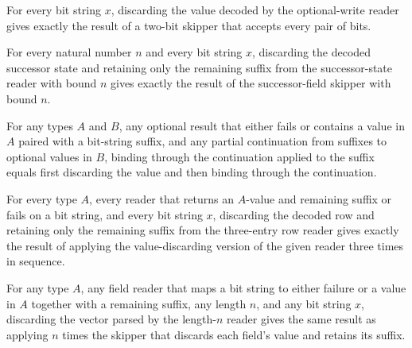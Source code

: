\begin{lemma}
\label{Turing.codeEraseWrite}
\leanok
{}
For every bit string $x$, discarding the value decoded by the optional-write reader
gives exactly the result of a two-bit skipper that accepts every pair of bits.
\end{lemma}

\begin{lemma}
\label{Turing.codeEraseState}
\leanok
{}
For every natural number $n$ and every bit string $x$, discarding the decoded successor
state and retaining only the remaining suffix from the successor-state reader with bound
$n$ gives exactly the result of the successor-field skipper with bound $n$.
\end{lemma}

\begin{lemma}
\label{Turing.codeErase_bind}
\leanok
{}
For any types $A$ and $B$, any optional result that either fails or contains a value in
$A$ paired with a bit-string suffix, and any partial continuation from suffixes to
optional values in $B$, binding through the continuation applied to the suffix equals
first discarding the value and then binding through the continuation.
\end{lemma}

\begin{lemma}
\label{Turing.codeEraseSymbols}
\leanok
{}
For every type $A$, every reader that returns an $A$-value and remaining suffix or fails
on a bit string, and every bit string $x$, discarding the decoded row and retaining only
the remaining suffix from the three-entry row reader gives exactly the result of
applying the value-discarding version of the given reader three times in sequence.
\end{lemma}

\begin{lemma}
\label{Turing.codeEraseVec}
\leanok
{}
For any type $A$, any field reader that maps a bit string to either failure or a value
in $A$ together with a remaining suffix, any length $n$, and any bit string $x$,
discarding the vector parsed by the length-$n$ reader gives the same result as applying
$n$ times the skipper that discards each field's value and retains its suffix.
\end{lemma}

